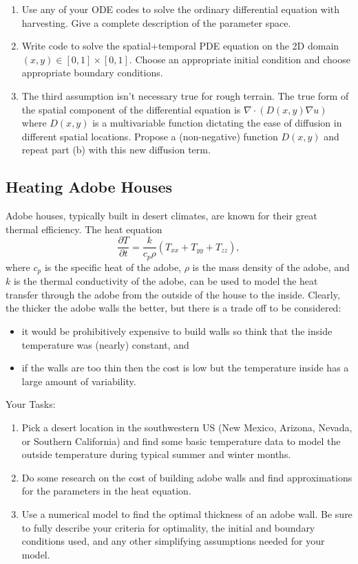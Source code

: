 \documentclass[
]{book}
\theoremstyle{definition}
\theoremstyle{definition}
\theoremstyle{definition}
\theoremstyle{remark}
\begin{document}
\begin{enumerate}
\def\labelenumi{\arabic{enumi}.}
\item
  Use any of your ODE codes to solve the ordinary differential
  equation with harvesting. Give a complete description of the
  parameter space.
\item
  Write code to solve the spatial+temporal PDE equation on the 2D
  domain \((x,y) \in [0,1] \times [0,1]\). Choose an appropriate initial
  condition and choose appropriate boundary conditions.
\item
  The third assumption isn't necessary true for rough terrain. The
  true form of the spatial component of the differential equation is
  \(\nabla \cdot  \left( D(x,y) \nabla u \right)\) where \(D(x,y)\) is a
  multivariable function dictating the ease of diffusion in different
  spatial locations. Propose a (non-negative) function \(D(x,y)\) and
  repeat part (b) with this new diffusion term.
\end{enumerate}

\hypertarget{heating-adobe-houses}{%
\subsection{Heating Adobe Houses}\label{heating-adobe-houses}}

Adobe houses, typically built in desert climates, are known for their
great thermal efficiency. The heat equation
\[\frac{\partial T}{\partial t} = \frac{k}{c_p \rho} \left( T_{xx} + T_{yy} + T_{zz} \right),\]
where \(c_p\) is the specific heat of the adobe, \(\rho\) is the mass
density of the adobe, and \(k\) is the thermal conductivity of the adobe,
can be used to model the heat transfer through the adobe from the
outside of the house to the inside. Clearly, the thicker the adobe walls
the better, but there is a trade off to be considered:

\begin{itemize}
\item
  it would be prohibitively expensive to build walls so think that the
  inside temperature was (nearly) constant, and
\item
  if the walls are too thin then the cost is low but the temperature
  inside has a large amount of variability.
\end{itemize}

Your Tasks:

\begin{enumerate}
\def\labelenumi{\arabic{enumi}.}
\item
  Pick a desert location in the southwestern US (New Mexico, Arizona,
  Nevada, or Southern California) and find some basic temperature data
  to model the outside temperature during typical summer and winter
  months.
\item
  Do some research on the cost of building adobe walls and find
  approximations for the parameters in the heat equation.
\item
  Use a numerical model to find the optimal thickness of an adobe
  wall. Be sure to fully describe your criteria for optimality, the
  initial and boundary conditions used, and any other simplifying
  assumptions needed for your model.
\end{enumerate}
\end{document}

